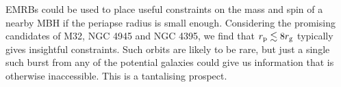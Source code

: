 
EMRBs could be used to place useful constraints on the mass and spin of a nearby MBH if the periapse radius is small enough. Considering the promising candidates of M32, NGC 4945 and NGC 4395, we find that $r_\mathrm{p} \lesssim 8 r_\mathrm{g}$ typically gives insightful constraints. Such orbits are likely to be rare, but just a single such burst from any of the potential galaxies could give us information that is otherwise inaccessible. This is a tantalising prospect.
